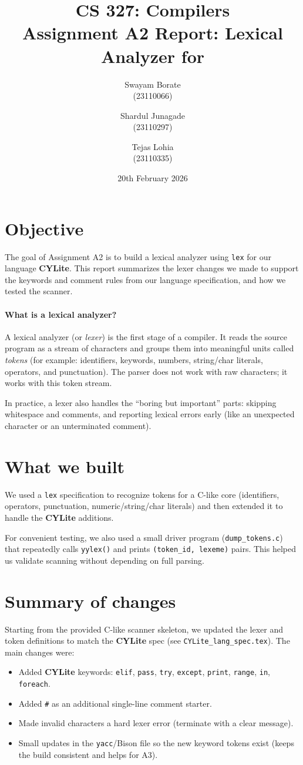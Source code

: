 \documentclass[11pt]{article}
\title{CS 327: Compilers\\Assignment A2 Report: Lexical Analyzer for \lang}
\author{Swayam Borate\\(23110066) \and Shardul Junagade\\(23110297) \and Tejas Lohia\\(23110335)}
\date{20th February 2026}
\newcommand{\lang}{\textbf{CYLite}}
\begin{document}
\maketitle

\section{Objective}
The goal of Assignment A2 is to build a lexical analyzer using \texttt{lex} for our language \lang{}.
This report summarizes the lexer changes we made to support the keywords and comment rules from our language specification, and how we tested the scanner.

\paragraph{What is a lexical analyzer?}
A lexical analyzer (or \emph{lexer}) is the first stage of a compiler.
It reads the source program as a stream of characters and groups them into meaningful units called \emph{tokens} (for example: identifiers, keywords, numbers, string/char literals, operators, and punctuation).
The parser does not work with raw characters; it works with this token stream.

In practice, a lexer also handles the ``boring but important'' parts: skipping whitespace and comments, and reporting lexical errors early (like an unexpected character or an unterminated comment).

\section{What we built}
We used a \texttt{lex} specification to recognize tokens for a C-like core (identifiers, operators, punctuation, numeric/string/char literals) and then extended it to handle the \lang{} additions.

For convenient testing, we also used a small driver program (\texttt{dump\_tokens.c}) that repeatedly calls \texttt{yylex()} and prints \texttt{(token\_id, lexeme)} pairs.
This helped us validate scanning without depending on full parsing.

\section{Summary of changes}
Starting from the provided C-like scanner skeleton, we updated the lexer and token definitions to match the \lang{} spec (see \texttt{CYLite\_lang\_spec.tex}).
The main changes were:
\begin{itemize}
	\item Added \lang{} keywords: \texttt{elif}, \texttt{pass}, \texttt{try}, \texttt{except}, \texttt{print}, \texttt{range}, \texttt{in}, \texttt{foreach}.
	\item Added \texttt{\#} as an additional single-line comment starter.
	\item Made invalid characters a hard lexer error (terminate with a clear message).
	\item Small updates in the \texttt{yacc}/Bison file so the new keyword tokens exist (keeps the build consistent and helps for A3).
\end{itemize}
\end{document}
